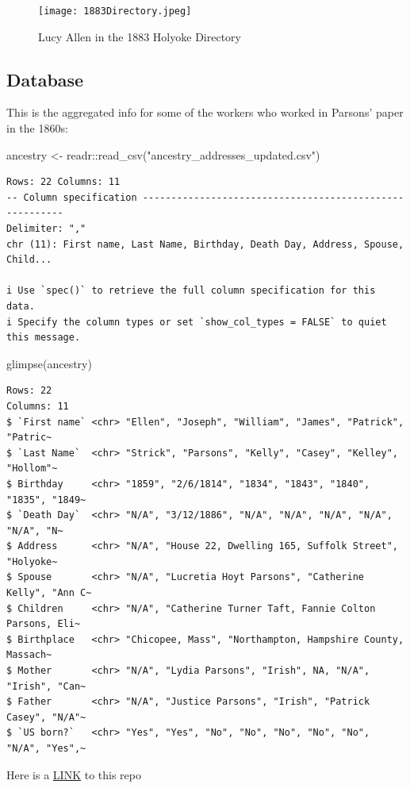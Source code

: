 \documentclass[
  letterpaper,
  DIV=11,
  numbers=noendperiod]{scrartcl}
\newenvironment{Shaded}{\begin{snugshade}}{\end{snugshade}}
\newcommand{\FunctionTok}[1]{\textcolor[rgb]{0.28,0.35,0.67}{#1}}
\newcommand{\NormalTok}[1]{\textcolor[rgb]{0.00,0.23,0.31}{#1}}
\newcommand{\OtherTok}[1]{\textcolor[rgb]{0.00,0.23,0.31}{#1}}
\newcommand{\SpecialCharTok}[1]{\textcolor[rgb]{0.37,0.37,0.37}{#1}}
\newcommand{\StringTok}[1]{\textcolor[rgb]{0.13,0.47,0.30}{#1}}
\begin{document}
\begin{figure}

{\centering \texttt{[image: 1883Directory.jpeg]}

}

\caption{\label{fig-sample12}Lucy Allen in the 1883 Holyoke Directory}

\end{figure}

\hypertarget{database}{%
\subsection{Database}\label{database}}

This is the aggregated info for some of the workers who worked in
Parsons' paper in the 1860s:

\begin{Shaded}
\begin{Highlighting}[]
\NormalTok{ancestry }\OtherTok{\textless{}{-}}\NormalTok{ readr}\SpecialCharTok{::}\FunctionTok{read\_csv}\NormalTok{(}\StringTok{"ancestry\_addresses\_updated.csv"}\NormalTok{)}
\end{Highlighting}
\end{Shaded}

\begin{verbatim}
Rows: 22 Columns: 11
-- Column specification --------------------------------------------------------
Delimiter: ","
chr (11): First name, Last Name, Birthday, Death Day, Address, Spouse, Child...

i Use `spec()` to retrieve the full column specification for this data.
i Specify the column types or set `show_col_types = FALSE` to quiet this message.
\end{verbatim}

\begin{Shaded}
\begin{Highlighting}[]
\FunctionTok{glimpse}\NormalTok{(ancestry)}
\end{Highlighting}
\end{Shaded}

\begin{verbatim}
Rows: 22
Columns: 11
$ `First name` <chr> "Ellen", "Joseph", "William", "James", "Patrick", "Patric~
$ `Last Name`  <chr> "Strick", "Parsons", "Kelly", "Casey", "Kelley", "Hollom"~
$ Birthday     <chr> "1859", "2/6/1814", "1834", "1843", "1840", "1835", "1849~
$ `Death Day`  <chr> "N/A", "3/12/1886", "N/A", "N/A", "N/A", "N/A", "N/A", "N~
$ Address      <chr> "N/A", "House 22, Dwelling 165, Suffolk Street", "Holyoke~
$ Spouse       <chr> "N/A", "Lucretia Hoyt Parsons", "Catherine Kelly", "Ann C~
$ Children     <chr> "N/A", "Catherine Turner Taft, Fannie Colton Parsons, Eli~
$ Birthplace   <chr> "Chicopee, Mass", "Northampton, Hampshire County, Massach~
$ Mother       <chr> "N/A", "Lydia Parsons", "Irish", NA, "N/A", "Irish", "Can~
$ Father       <chr> "N/A", "Justice Parsons", "Irish", "Patrick Casey", "N/A"~
$ `US born?`   <chr> "Yes", "Yes", "No", "No", "No", "No", "No", "N/A", "Yes",~
\end{verbatim}

Here is a
\href{https://github.com/STAT210-S23/Parsons_Paper_Register}{LINK} to
this repo
\end{document}
